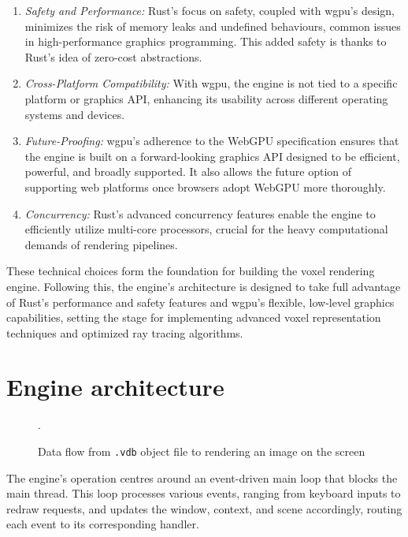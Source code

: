 \begin{enumerate}
  \item \emph{Safety and Performance:} Rust's focus on safety, coupled with wgpu's design, minimizes the risk of memory leaks and undefined behaviours, common issues in high-performance graphics programming. This added safety is thanks to Rust's idea of zero-cost abstractions.

  \item \emph{Cross-Platform Compatibility:} With wgpu, the engine is not tied to a specific platform or graphics API, enhancing its usability across different operating systems and devices.

  \item \emph{Future-Proofing:} wgpu's adherence to the WebGPU specification ensures that the engine is built on a forward-looking graphics API designed to be efficient, powerful, and broadly supported. It also allows the future option of supporting web platforms once browsers adopt WebGPU more thoroughly.

  \item \emph{Concurrency:} Rust's advanced concurrency features enable the engine to efficiently utilize multi-core processors, crucial for the heavy computational demands of rendering pipelines.
\end{enumerate}

These technical choices form the foundation for building the voxel rendering engine. Following this, the engine's architecture is designed to take full advantage of Rust's performance and safety features and wgpu's flexible, low-level graphics capabilities, setting the stage for implementing advanced voxel representation techniques and optimized ray tracing algorithms.

\section{Engine architecture}

\begin{figure}[H]
  \centering
  
  \caption{Data flow from \texttt{.vdb} object file to rendering an image on the screen}.
\end{figure}

The engine's operation centres around an event-driven main loop that blocks the main thread.
This loop processes various events, ranging from keyboard inputs to redraw requests, and updates the window, context, and scene accordingly, routing each event to its corresponding handler.

